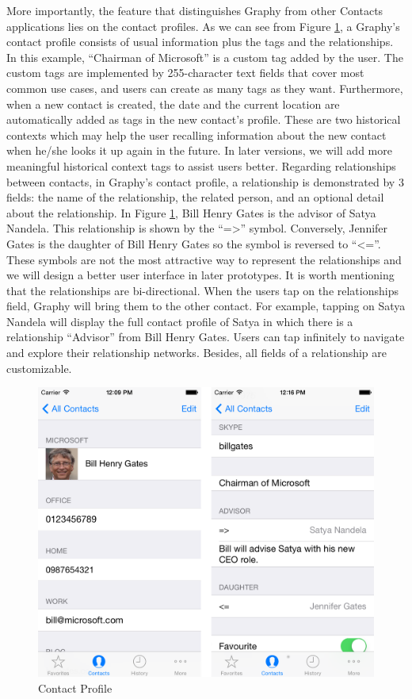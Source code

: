 More importantly, the feature that distinguishes Graphy from other Contacts applications lies on the contact profiles. As we can see from Figure \ref{fg:contactscreen}, a Graphy's contact profile consists of usual information plus the tags and the relationships. In this example, ``Chairman of Microsoft'' is a custom tag added by the user. The custom tags are implemented by 255-character text fields that cover most common use cases, and users can create as many tags as they want. Furthermore, when a new contact is created, the date and the current location are automatically added as tags in the new contact's profile. These are two historical contexts which may help the user recalling information about the new contact when he/she looks it up again in the future. In later versions, we will add more meaningful historical context tags to assist users better. Regarding relationships between contacts, in Graphy's contact profile, a relationship is demonstrated by 3 fields: the name of the relationship, the related person, and an optional detail about the relationship. In Figure \ref{fg:contactscreen}, Bill Henry Gates is the advisor of Satya Nandela. This relationship is shown by the ``=>'' symbol. Conversely, Jennifer Gates is the daughter of Bill Henry Gates so the symbol is reversed to ``<=''. These symbols are not the most attractive way to represent the relationships and we will design a better user interface in later prototypes. It is worth mentioning that the relationships are bi-directional. When the users tap on the relationships field, Graphy will bring them to the other contact. For example, tapping on Satya Nandela will display the full contact profile of Satya in which there is a relationship ``Advisor'' from Bill Henry Gates. Users can tap infinitely to navigate and explore their relationship networks. Besides, all fields of a relationship are customizable.

\begin{figure}[!h]
\begin{centering}
\includegraphics[scale=0.3]{pics/contactscreen}
\caption{Contact Profile}\label{fg:contactscreen}
\end{centering}
\end{figure}


